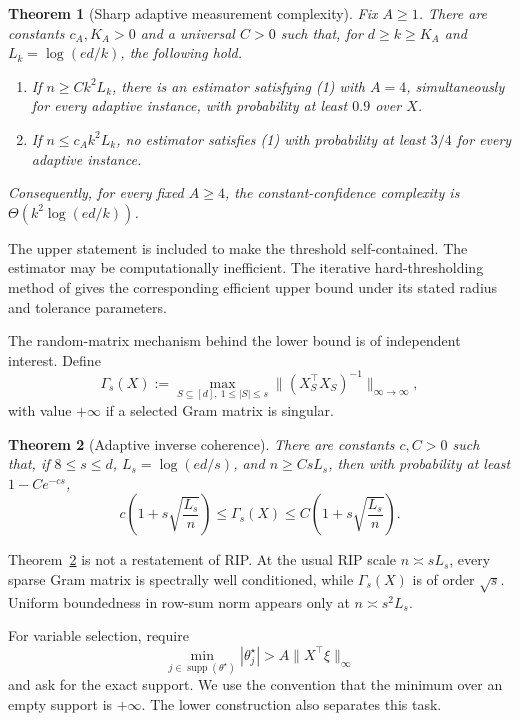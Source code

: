 \documentclass[twoside]{article}
\newtheorem{theorem}{Theorem}
\newcommand{\supp}{\operatorname{supp}}
\begin{document}
\begin{theorem}[Sharp adaptive measurement complexity]
\label{thm:complexity}
Fix $A\geq1$. There are constants $c_A,K_A>0$ and a universal $C>0$ such that, for $d\geq k\geq K_A$ and $L_k=\log(ed/k)$, the following hold.
\begin{enumerate}
\item If $n\geq Ck^2L_k$, there is an estimator satisfying (1) with
$A=4$, simultaneously for every adaptive instance, with probability at least $0.9$ over $X$.
\item If $n\leq c_Ak^2L_k$, no estimator satisfies (1) with probability at
least $3/4$ for every adaptive instance.
\end{enumerate}
Consequently, for every fixed $A\geq4$, the constant-confidence complexity is $\Theta(k^2\log(ed/k))$.
\end{theorem}

The upper statement is included to make the threshold self-contained. The estimator may be computationally inefficient. The iterative hard-thresholding method of \citet{chen2026adaptive} gives the corresponding efficient upper bound under its stated radius and tolerance parameters.

The random-matrix mechanism behind the lower bound is of independent interest. Define \[ \Gamma_s(X):= \max_{S\subseteq[d],\ 1\leq |S|\leq s} \|(X_S^\top X_S)^{-1}\|_{\infty\to\infty}, \tag{2} \] with value $+\infty$ if a selected Gram matrix is singular.

\begin{theorem}[Adaptive inverse coherence]
\label{thm:inverse}
There are constants $c,C>0$ such that, if $8\leq s\leq d$, $L_s=\log(ed/s)$, and $n\geq CsL_s$, then with probability at least $1-Ce^{-cs}$, \[ c\left(1+s\sqrt{\frac{L_s}{n}}\right) \leq \Gamma_s(X) \leq C\left(1+s\sqrt{\frac{L_s}{n}}\right). \tag{3} \]
\end{theorem}

Theorem~\ref{thm:inverse} is not a restatement of RIP. At the usual RIP scale $n\asymp sL_s$, every sparse Gram matrix is spectrally well conditioned, while $\Gamma_s(X)$ is of order $\sqrt{s}$. Uniform boundedness in row-sum norm appears only at $n\asymp s^2L_s$.

For variable selection, require \[ \min_{j\in\supp(\theta^\star)}|\theta_j^\star| >A\|X^\top\xi\|_\infty \tag{4} \] and ask for the exact support. We use the convention that the minimum over an empty support is $+\infty$. The lower construction also separates this task.
\end{document}
